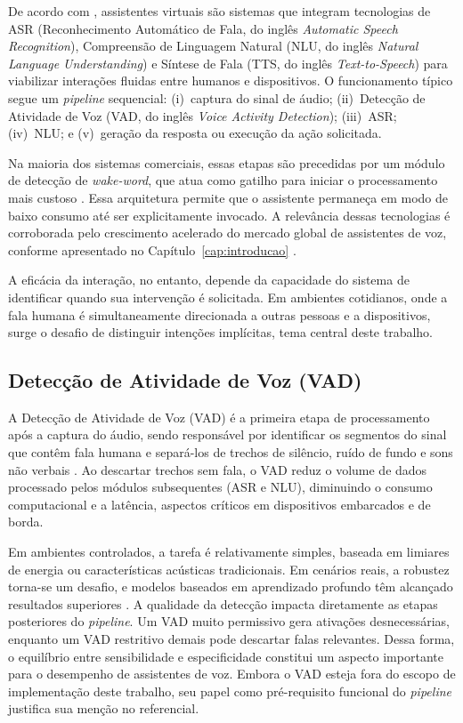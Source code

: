 \documentclass[
    12pt,                %
    openright,           %
    oneside,             %
    a4paper,             %
    english,             %
    brazil               %
]{abntex2}
\begin{document}
De acordo com , assistentes virtuais são sistemas que integram tecnologias de ASR (Reconhecimento Automático de Fala, do inglês \textit{Automatic Speech Recognition}), Compreensão de Linguagem Natural (NLU, do inglês \textit{Natural Language Understanding}) e Síntese de Fala (TTS, do inglês \textit{Text-to-Speech}) para viabilizar interações fluidas entre humanos e dispositivos. O funcionamento típico segue um \textit{pipeline} sequencial: (i)~captura do sinal de áudio; (ii)~Detecção de Atividade de Voz (VAD, do inglês \textit{Voice Activity Detection}); (iii)~ASR; (iv)~NLU; e (v)~geração da resposta ou execução da ação solicitada.

Na maioria dos sistemas comerciais, essas etapas são precedidas por um módulo de detecção de \textit{wake-word}, que atua como gatilho para iniciar o processamento mais custoso \cite{Garg2021}. Essa arquitetura permite que o assistente permaneça em modo de baixo consumo até ser explicitamente invocado. A relevância dessas tecnologias é corroborada pelo crescimento acelerado do mercado global de assistentes de voz, conforme apresentado no Capítulo~\ref{cap:introducao} \cite{NMSC2025}.

A eficácia da interação, no entanto, depende da capacidade do sistema de identificar quando sua intervenção é solicitada. Em ambientes cotidianos, onde a fala humana é simultaneamente direcionada a outras pessoas e a dispositivos, surge o desafio de distinguir intenções implícitas, tema central deste trabalho.


\subsection{Detecção de Atividade de Voz (VAD)}

A Detecção de Atividade de Voz (VAD) é a primeira etapa de processamento após a captura do áudio, sendo responsável por identificar os segmentos do sinal que contêm fala humana e separá-los de trechos de silêncio, ruído de fundo e sons não verbais \cite{Li2021}. Ao descartar trechos sem fala, o VAD reduz o volume de dados processado pelos módulos subsequentes (ASR e NLU), diminuindo o consumo computacional e a latência, aspectos críticos em dispositivos embarcados e de borda.

Em ambientes controlados, a tarefa é relativamente simples, baseada em limiares de energia ou características acústicas tradicionais. Em cenários reais, a robustez torna-se um desafio, e modelos baseados em aprendizado profundo têm alcançado resultados superiores \cite{Li2021}. A qualidade da detecção impacta diretamente as etapas posteriores do \textit{pipeline}. Um VAD muito permissivo gera ativações desnecessárias, enquanto um VAD restritivo demais pode descartar falas relevantes. Dessa forma, o equilíbrio entre sensibilidade e especificidade constitui um aspecto importante para o desempenho de assistentes de voz. Embora o VAD esteja fora do escopo de implementação deste trabalho, seu papel como pré-requisito funcional do \textit{pipeline} justifica sua menção no referencial.
\end{document}
